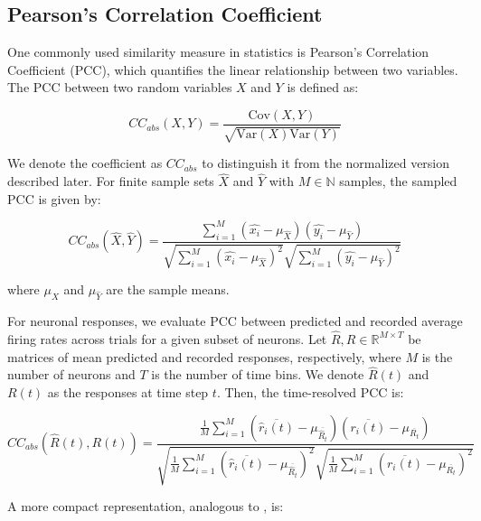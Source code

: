 \subsection{Pearson's Correlation Coefficient}
\label{subsec:pearson_cc}
One commonly used similarity measure in statistics is Pearson's Correlation Coefficient (PCC), which quantifies the linear relationship between two variables. The PCC between two random variables $X$ and $Y$ is defined as:

\begin{equation}
    CC_{abs}(X, Y) = \frac{\text{Cov}(X,Y)}{\sqrt{\text{Var}(X)\text{Var}(Y)}}
\end{equation}
\label{eq:pearson_general}

We denote the coefficient as $CC_{abs}$ to distinguish it from the normalized version described later. For finite sample sets $\hat{X}$ and $\hat{Y}$ with $M \in \mathbb{N}$ samples, the sampled PCC is given by:

\begin{equation}
    CC_{abs}(\hat{X}, \hat{Y}) 
    = \frac{\sum_{i=1}^{M}(\hat{x_i} - \mu_{\hat{X}})(\hat{y_i} - \mu_{\hat{Y}})}
    {\sqrt{\sum_{i=1}^{M}(\hat{x_i} - \mu_{\hat{X}})^{2}}
    \sqrt{\sum_{i=1}^{M}(\hat{y_i} - \mu_{\hat{Y}})^{2}}}
\end{equation}
\label{eq:pearson_sampled}

where $\mu_{\hat{X}}$ and $\mu_{\hat{Y}}$ are the sample means.

For neuronal responses, we evaluate PCC between predicted and recorded average firing rates across trials for a given subset of neurons. Let $\hat{R}, R \in \mathbb{R}^{M \times T}$ be matrices of mean predicted and recorded responses, respectively, where $M$ is the number of neurons and $T$ is the number of time bins. We denote $\hat{R}(t)$ and $R(t)$ as the responses at time step $t$. Then, the time-resolved PCC is:

\begin{equation}
    CC_{abs}(\hat{R}(t), R(t)) = 
    \frac{\frac{1}{M} \sum_{i=1}^{M} 
    (\overline{\hat{r}_i(t)} - \mu_{\overline{\hat{R}_t}})
    (\overline{r_i(t)} - \mu_{\overline{R_t}})}
    {\sqrt{\frac{1}{M} \sum_{i=1}^{M} (\overline{\hat{r}_i(t)} - \mu_{\overline{\hat{R}_t}})^2}
    \sqrt{\frac{1}{M} \sum_{i=1}^{M} (\overline{r_i(t)} - \mu_{\overline{R_t}})^2}}
\end{equation}
\label{eq:pearson_neurons}

A more compact representation, analogous to \citet{Wang2023towards}, is:

